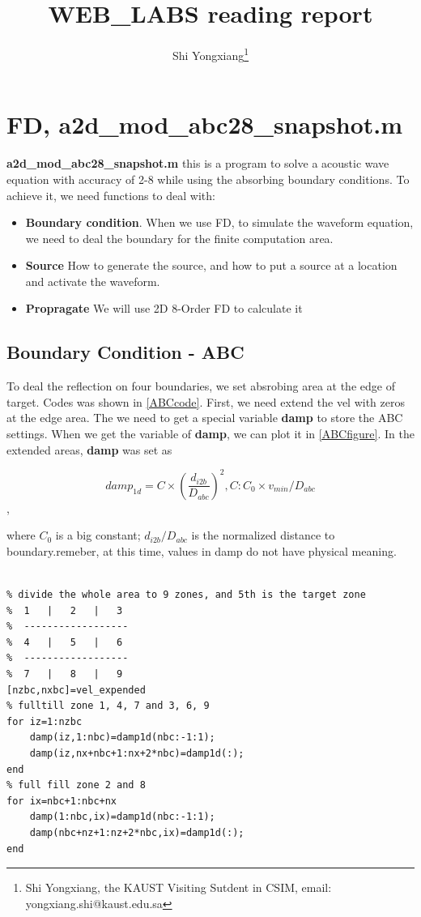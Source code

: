 \documentclass[a4paper, UTF8]{article}
\author{Shi Yongxiang\footnote{Shi Yongxiang, the KAUST Visiting Sutdent in CSIM, email: yongxiang.shi@kaust.edu.sa}}
\title{WEB\_LABS reading report}
\begin{document}
	
	\maketitle

\section{FD, a2d\_mod\_abc28\_snapshot.m}
	\textbf{a2d\_mod\_abc28\_snapshot.m}
	this is a program to solve a acoustic wave equation with accuracy of 2-8 while using the absorbing boundary conditions. To achieve it, we need functions to deal with:

	\begin{itemize}
		\item[1] \textbf{Boundary condition}. When we use FD, to simulate the waveform equation, we need to deal the boundary for the finite computation area.
		\item[2] \textbf{Source} How to generate the source, and how to put a source at a location and activate the waveform.
		\item[3] \textbf{Propragate} We will use 2D 8-Order FD to calculate it
	\end{itemize}

	\subsection{Boundary Condition - ABC}
		 To deal the reflection on four boundaries, we set absrobing area at the edge of target. Codes was shown in \autoref{ABCcode}. 
		 First, we need extend the vel with zeros at the edge area. The we need to get a special variable \textbf{damp} to store the ABC settings. 
		 When we get the variable of \textbf{damp}, we can plot it in \autoref{ABCfigure}. 
		 In the extended areas, \textbf{damp} was set as

		 $$damp_{1d}=C\times(\frac{d_{i2b}}{D_{abc}})^2,C: C_0\times v_{min}/D_{abc}$$,

		 where $C_0$ is a big constant; $d_{i2b}/D_{abc}$ is the normalized distance to boundary.remeber, at this time, values in damp do not have physical meaning.

		\begin{lstlisting}[caption=set ABC to the velocity variable (2 is same), label=ABCcode]

% divide the whole area to 9 zones, and 5th is the target zone
%  1   |   2   |   3
%  ------------------
%  4   |   5   |   6
%  ------------------
%  7   |   8   |   9
[nzbc,nxbc]=vel_expended
% fulltill zone 1, 4, 7 and 3, 6, 9
for iz=1:nzbc
    damp(iz,1:nbc)=damp1d(nbc:-1:1);
    damp(iz,nx+nbc+1:nx+2*nbc)=damp1d(:);
end
% full fill zone 2 and 8
for ix=nbc+1:nbc+nx
    damp(1:nbc,ix)=damp1d(nbc:-1:1);
    damp(nbc+nz+1:nz+2*nbc,ix)=damp1d(:);
end
	    \end{lstlisting}
\end{document}
